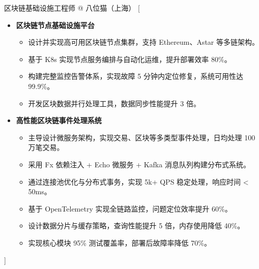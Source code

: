 \documentclass[zh]{resume}
\begin{document}
\begin{experiences}
    {区块链基础设施工程师 @ 八位猫（上海）}%
    [\begin{itemize}
      \item \textbf{区块链节点基础设施平台}
        \begin{itemize}
          \item 设计并实现高可用区块链节点集群，支持 Ethereum、Astar 等多链架构。
          \item 基于 K8s 实现节点服务编排与自动化运维，提升部署效率 80\%。
          \item 构建完整监控告警体系，实现故障 5 分钟内定位修复，系统可用性达 99.9\%。
          \item 开发区块数据并行处理工具，数据同步性能提升 3 倍。
        \end{itemize}
      \item \textbf{高性能区块链事件处理系统}
        \begin{itemize}
          \item 主导设计微服务架构，实现交易、区块等多类型事件处理，日均处理 100 万笔交易。
          \item 采用 Fx 依赖注入 + Echo 微服务 + Kafka 消息队列构建分布式系统。
          \item 通过连接池优化与分布式事务，实现 5k+ QPS 稳定处理，响应时间 < 50ms。
          \item 基于 OpenTelemetry 实现全链路监控，问题定位效率提升 60\%。
          \item 设计数据分片与缓存策略，查询性能提升 5 倍，内存使用降低 40\%。
          \item 实现核心模块 95\% 测试覆盖率，部署后故障率降低 70\%。
        \end{itemize}
      \end{itemize}]
\end{experiences}
\end{document}
